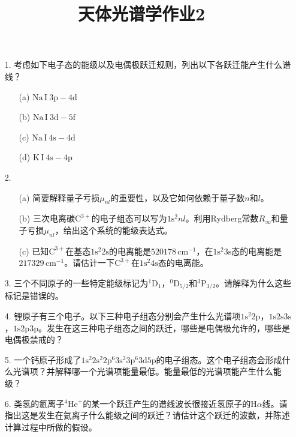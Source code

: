 \documentclass[a4paper]{article}
\begin{document}
\title{\textbf{天体光谱学作业2}}
\author{}
\date{}
\maketitle

\begin{enumerate}
    \item[1.] 考虑如下电子态的能级以及电偶极跃迁规则，列出以下各跃迁能产生什么谱线？
    \begin{enumerate}
        \item[(a)] $\mathrm{Na\,I\ 3p - 4d}$

        \item[(b)] $\mathrm{Na\,I\ 3d - 5f}$

        \item[(c)] $\mathrm{Na\,I\ 4s - 4d}$
        
        \item[(d)] $\mathrm{K\,I\ 4s - 4p}$
    \end{enumerate}

    \item[2.]
    \begin{enumerate}
        \item[(a)] 简要解释量子亏损$\mu_{nl}$的重要性，以及它如何依赖于量子数$n$和$l$。

        \item[(b)] 三次电离碳$\mathrm{C^{3+}}$的电子组态可以写为$\mathrm{1s^2} nl$。利用Rydberg常数$R_\infty$和量子亏损$\mu_{nl}$，给出这个系统的能级表达式。

        \item[(c)] 已知$\mathrm{C^{3+}}$在基态$\mathrm{1s^2 2s}$的电离能是$520178\,\mathrm{cm^{-1}}$，在$\mathrm{1s^2 3s}$态的电离能是$217329\,\mathrm{cm^{-1}}$。请估计一下$\mathrm{C^{3+}}$在$\mathrm{1s^2 4s}$态的电离能。
    \end{enumerate}

    \item[3.] 三个不同原子的一些特定能级标记为$^1\mathrm{D}_1$，$^0\mathrm{D}_{5/2}$和$^3\mathrm{P}_{3/2}$。请解释为什么这些标记是错误的。

    \item[4.] 锂原子有三个电子。以下三种电子组态分别会产生什么光谱项$\mathrm{1s^2 2p}$，$\mathrm{1s 2s 3s}$，$\mathrm{1s 2p 3p}$。发生在这三种电子组态之间的跃迁，哪些是电偶极允许的，哪些是电偶极禁戒的？

    \item[5.] 一个钙原子形成了$\mathrm{1s^2 2s^2 2p^6 3s^2 3p^6 3d 5p}$的电子组态。这个电子组态会形成什么光谱项？并解释哪一个光谱项能量最低。能量最低的光谱项能产生什么能级？

    \item[6.] 类氢的氦离子$^4\mathrm{He}^+$的某一个跃迁产生的谱线波长很接近氢原子的$\mathrm{H}\alpha$线。请指出这是发生在氦离子什么能级之间的跃迁？请估计这个跃迁的波数，并陈述计算过程中所做的假设。

\end{enumerate}
\end{document}
